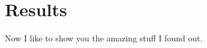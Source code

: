 \documentclass[subfiles-np.tex]{subfiles}
\begin{document}
\section{Results}

Now I like to show you the amazing stuff I found out.
\end{document}
